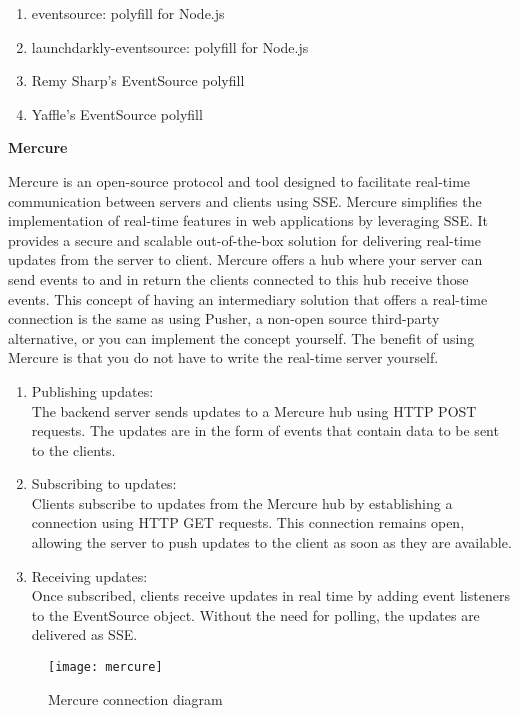 \begin{enumerate}
    \item eventsource: polyfill for Node.js
    \item launchdarkly-eventsource: polyfill for Node.js
    \item Remy Sharp's EventSource polyfill
    \item Yaffle's EventSource polyfill
\end{enumerate}

\textbf{Mercure}

Mercure is an open-source protocol and tool designed to facilitate real-time communication between servers and clients using SSE. Mercure simplifies the implementation of real-time features in web applications by leveraging SSE. It provides a secure and scalable out-of-the-box solution for delivering real-time updates from the server to client. Mercure offers a hub where your server can send events to and in return the clients connected to this hub receive those events. This concept of having an intermediary solution that offers a real-time connection is the same as using Pusher, a non-open source third-party alternative, or you can implement the concept yourself. The benefit of using Mercure is that you do not have to write the real-time server yourself. \cite{mercure}

\begin{enumerate}
    \item Publishing updates: \\ The backend server sends updates to a Mercure hub using HTTP POST requests. The updates are in the form of events that contain data to be sent to the clients.
    \item Subscribing to updates: \\ Clients subscribe to updates from the Mercure hub by establishing a connection using HTTP GET requests. This connection remains open, allowing the server to push updates to the client as soon as they are available.
    \item Receiving updates: \\ Once subscribed, clients receive updates in real time by adding event listeners to the EventSource object. Without the need for polling, the updates are delivered as SSE.
\end{enumerate}

\begin{figure}[h]
  \caption{Mercure connection diagram}
  \texttt{[image: mercure]}
  \centering
\end{figure}

